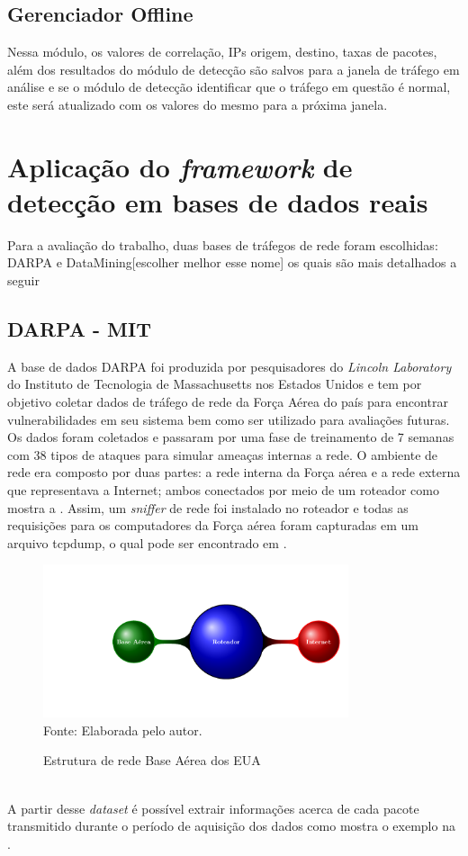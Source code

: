\subsection{Gerenciador Offline}
Nessa módulo, os valores de correlação, IPs origem, destino, taxas de pacotes, além dos resultados do módulo de detecção são salvos para a janela de tráfego em análise e se o módulo de detecção identificar que o tráfego em questão é normal, este será atualizado com os valores do mesmo para a próxima janela.

\section{Aplicação do \textit{framework} de detecção em bases de dados reais}
\label{Sec:NaHiD_VERC}
Para a avaliação do trabalho, duas bases de tráfegos de rede foram escolhidas: DARPA e  DataMining[escolher melhor esse nome] os quais são mais detalhados a seguir 
\subsection{DARPA - MIT}
 A base de dados DARPA foi produzida por pesquisadores do \textit{Lincoln Laboratory} do Instituto de Tecnologia de Massachusetts nos Estados Unidos e tem por objetivo coletar dados de tráfego de rede da Força Aérea do país para encontrar vulnerabilidades em seu sistema bem como ser utilizado para avaliações futuras. Os dados foram coletados e passaram por uma fase de treinamento de 7 semanas com 38 tipos de ataques para simular ameaças internas a rede. O ambiente de rede era composto por duas partes: a rede interna da Força aérea e a rede externa que representava a Internet; ambos conectados por meio de um roteador como mostra a .	Assim, um \textit{sniffer} de rede foi instalado no roteador e todas as requisições para os computadores da Força aérea foram capturadas em um arquivo tcpdump, o qual pode ser encontrado em \cite{siteDarpa}. 
 \begin{figure}[ht]
 	\centering
	\caption{Estrutura de rede Base Aérea dos EUA }
		\includegraphics[width=0.8\textwidth]{figs/darpaStructure.pdf}\\
	{Fonte: Elaborada pelo autor.}
	\label{fig:DARPA_Estrututra}
\end{figure}
\\
A partir desse \textit{dataset} é possível extrair informações acerca de cada pacote transmitido durante o período de aquisição dos dados como mostra o exemplo na .

